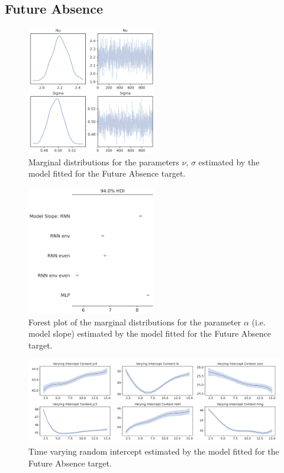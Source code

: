 \subsection{Future Absence}
\label{future_abs_bayes_3}

\begin{figure}[H]
\centering
\includegraphics[width=0.5\textwidth]{images/appendix_C/Future Absence_marginals_3.png}
\caption[\textbf{Future absence marginal distributions}]{Marginal distributions for the parameters $\nu$, $\sigma$ estimated by the model fitted for the Future Absence target.}
\label{marginals_abs_3}
\end{figure}

\begin{figure}[H]
\centering
\includegraphics[width=0.5\textwidth]{images/appendix_C/Future Absence_models_3.png}
\caption[\textbf{Future absence model fixed effect}]{Forest plot of the marginal distributions for the parameter $\alpha$ (i.e. model slope) estimated by the model fitted for the Future Absence target.}
\label{model_abs_3}
\end{figure}

\begin{figure}[H]
\centering
\includegraphics[width=\textwidth]{images/appendix_C/Future Absence_interc_3.png}
\caption[\textbf{Future absence time-varying random intercept}]{Time varying random intercept estimated by the model fitted for the Future Absence target.}
\label{interc_abs_3}
\end{figure}

